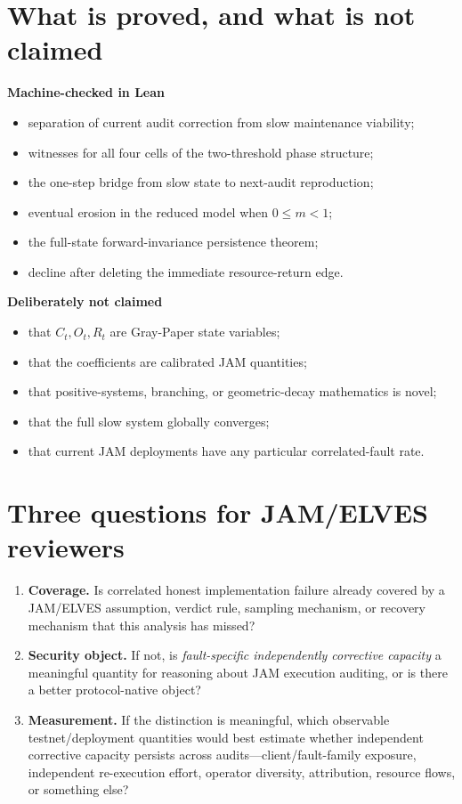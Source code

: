 \documentclass[10pt,a4paper]{article}
\begin{document}
\section{What is proved, and what is not claimed}

\begin{minipage}[t]{0.48\linewidth}
\textbf{Machine-checked in Lean}
\begin{itemize}
  \item separation of current audit correction from slow maintenance viability;
  \item witnesses for all four cells of the two-threshold phase structure;
  \item the one-step bridge from slow state to next-audit reproduction;
  \item eventual erosion in the reduced model when $0\le m<1$;
  \item the full-state forward-invariance persistence theorem;
  \item decline after deleting the immediate resource-return edge.
\end{itemize}
\end{minipage}\hfill
\begin{minipage}[t]{0.48\linewidth}
\textbf{Deliberately not claimed}
\begin{itemize}
  \item that $C_t,O_t,R_t$ are Gray-Paper state variables;
  \item that the coefficients are calibrated JAM quantities;
  \item that positive-systems, branching, or geometric-decay mathematics is novel;
  \item that the full slow system globally converges;
  \item that current JAM deployments have any particular correlated-fault rate.
\end{itemize}
\end{minipage}

\section{Three questions for JAM/ELVES reviewers}

\begin{enumerate}
\item \textbf{Coverage.} Is correlated honest implementation failure already covered by a JAM/ELVES assumption, verdict rule, sampling mechanism, or recovery mechanism that this analysis has missed?
\item \textbf{Security object.} If not, is \emph{fault-specific independently corrective capacity} a meaningful quantity for reasoning about JAM execution auditing, or is there a better protocol-native object?
\item \textbf{Measurement.} If the distinction is meaningful, which observable testnet/deployment quantities would best estimate whether independent corrective capacity persists across audits---client/fault-family exposure, independent re-execution effort, operator diversity, attribution, resource flows, or something else?
\end{enumerate}
\end{document}
